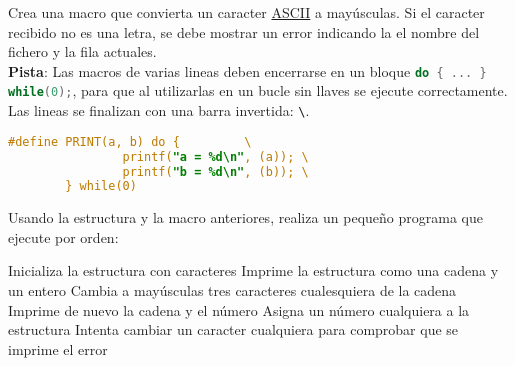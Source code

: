 \documentclass{tareas}
\begin{document}
\begin{problem}
\begin{statement}
	Crea una macro que convierta un caracter
	\href{https://es.wikipedia.org/wiki/ASCII#Caracteres_imprimibles_ASCII}{ASCII}
	a mayúsculas. Si el caracter recibido no es una letra, se debe mostrar
	un error indicando la el nombre del fichero y la fila actuales.
	\\[1em]
	\textbf{Pista}: Las macros de varias lineas deben encerrarse en un
	bloque \lstinline[language=C]|do { ... } while(0);|, para que al
	utilizarlas en un bucle sin llaves se ejecute correctamente. Las lineas
	se finalizan con una barra invertida: \texttt{\textbackslash}.
	\begin{lstlisting}[basicstyle=\normalfont, frame=none, numbers=none, language=C]
		#define PRINT(a, b) do {         \
		        printf("a = %d\n", (a)); \
		        printf("b = %d\n", (b)); \
		} while(0)
	\end{lstlisting}
\end{statement}
\end{problem}

\begin{problem}
\begin{statement}
	Usando la estructura y la macro anteriores, realiza un pequeño programa
	que ejecute por orden:

	\subp Inicializa la estructura con caracteres
	\subp Imprime la estructura como una cadena y un entero
	\subp Cambia a mayúsculas tres caracteres cualesquiera de la cadena
	\subp Imprime de nuevo la cadena y el número
	\subp Asigna un número cualquiera a la estructura
	\subp Intenta cambiar un caracter cualquiera para comprobar que se
	imprime el error
\end{statement}
\end{problem}
\end{document}
